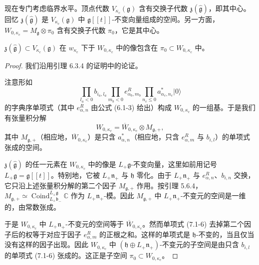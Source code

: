 现在专门考虑临界水平。顶点代数 $V_{\kappa_c}(\mathfrak{g})$ 含有交换子代数 $\mathfrak{z}(\hat{\mathfrak{g}})$，即其中心。回忆 $\mathfrak{z}(\hat{\mathfrak{g}})$ 是 $V_{\kappa_c}(\mathfrak{g})$ 中 $\mathfrak{g}[[t]]$-不变向量组成的空间。另一方面，$W_{0,\kappa_c}=M_{\mathfrak{g}}\otimes\pi_0$ 含有交换子代数 $\pi_0$，它是其中心。

\begin{lemma}
    $\mathfrak{z}(\hat{\mathfrak{g}})\subset V_{\kappa_c}(\mathfrak{g})$ 在 $w_{\kappa_c}$ 下于 $W_{0,\kappa_c}$ 中的像包含在 $\pi_0\subset W_{0,\kappa_c}$ 中。
\end{lemma}

\begin{proof}
我们沿用引理 6.3.4 的证明中的论证。

注意形如
\begin{equation}
    \prod_{l_a<0}b_{i_a,l_a}\prod_{m_b<0}e^R_{\alpha_b,m_b}\prod_{n_c\le0}a^*_{\alpha_c,n_c}|0\rangle
    \tag{7.1-6}
\end{equation}
的字典序单项式（其中 $e^R_{\alpha,n}$ 由公式 (6.1-3) 给出）构成 $W_{0,\kappa_c}$ 的一组基。于是我们有张量积分解
\[
    W_{0,\kappa_c}=\overline{W}_{0,\kappa_c}\otimes M_{\mathfrak{g},+},
\]
其中 $M_{\mathfrak{g},+}$（相应地，$\overline{W}_{0,\kappa_c}$）是只含 $a^*_{\alpha,n}$（相应地，只含 $e^R_{\alpha,m}$ 与 $b_{i,l}$）的单项式张成的空间。

$\mathfrak{z}(\hat{\mathfrak{g}})$ 的任一元素在 $W_{0,\kappa_c}$ 中的像是 $L_+\mathfrak{g}$-不变向量，这里如前用记号 $L_+\mathfrak{g}=\mathfrak{g}[[t]]$。特别地，它被 $L_+\mathfrak{n}_+$ 与 $\mathfrak{h}$ 零化。由于 $L_+\mathfrak{n}_+$ 与 $e^R_{\alpha,n}$、$b_{i,n}$ 交换，它只沿上述张量积分解的第二个因子 $M_{\mathfrak{g},+}$ 作用。按引理 5.6.4，$M_{\mathfrak{g},+}\simeq\operatorname{Coind}^{L_+\mathfrak{g}}_{L_+\mathfrak{b}_-}\mathbb{C}$ 作为 $L_+\mathfrak{n}_+$-模。因此 $M_{\mathfrak{g},+}$ 中 $L_+\mathfrak{n}_+$-不变元的空间是一维的，由常数张成。

于是 $W_{0,\kappa_c}$ 中 $L_+\mathfrak{n}_+$-不变元的空间等于 $\overline{W}_{0,\kappa_c}$。然而单项式 (7.1-6) 去掉第二个因子后的权等于对应于因子 $e^R_{\alpha,m}$ 的正根之和。这样的单项式是 $\mathfrak{h}$-不变的，当且仅当没有这样的因子出现。因此 $W_{0,\kappa_c}$ 中 $(\mathfrak{h}\oplus L_+\mathfrak{n}_+)$-不变元的子空间是由只含 $b_{i,l}$ 的单项式 (7.1-6) 张成的。这正是子空间 $\pi_0\subset W_{0,\kappa_c}$。
\end{proof}

